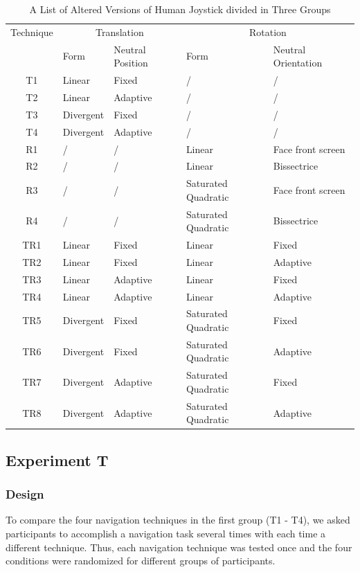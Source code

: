 \begin{table}[!t]
\renewcommand{\arraystretch}{1.3}
\caption{A List of Altered Versions of Human Joystick divided in Three Groups}
\label{tab:4_combinations}
\centering
\begin{tabular}{c l p{2.5cm} l p{2.5cm}}
  \hline
  Technique & \multicolumn{2}{c}{Translation} & \multicolumn{2}{c}{Rotation} \\
   & Form & Neutral Position & Form & Neutral Orientation \\ \hline
  T1 & Linear & Fixed & / & / \\
  T2 & Linear & Adaptive & / & / \\
  T3 & Divergent & Fixed & / & / \\
  T4 & Divergent & Adaptive & / & / \\ \hline
  R1 & / & / & Linear & Face front screen \\
  R2 & / & / & Linear & Bissectrice \\
  R3 & / & / & Saturated Quadratic & Face front screen \\
  R4 & / & / & Saturated Quadratic & Bissectrice \\ \hline
  TR1 & Linear & Fixed & Linear & Fixed \\ TR2 & Linear & Fixed & Linear & Adaptive \\
  TR3 & Linear & Adaptive & Linear & Fixed \\ TR4 & Linear & Adaptive & Linear & Adaptive \\
  TR5 & Divergent & Fixed & Saturated Quadratic & Fixed \\ TR6 & Divergent & Fixed & Saturated Quadratic & Adaptive \\
  TR7 & Divergent & Adaptive & Saturated Quadratic & Fixed \\ TR8 & Divergent & Adaptive & Saturated Quadratic & Adaptive \\
  \hline
\end{tabular}
\end{table}

\subsection{Experiment T}
\subsubsection{Design}
To compare the four navigation techniques in the first group (T1 - T4), we asked participants to accomplish a navigation task several times with each time a different technique. Thus, each navigation technique was tested once and the four conditions were randomized for different groups of participants.

